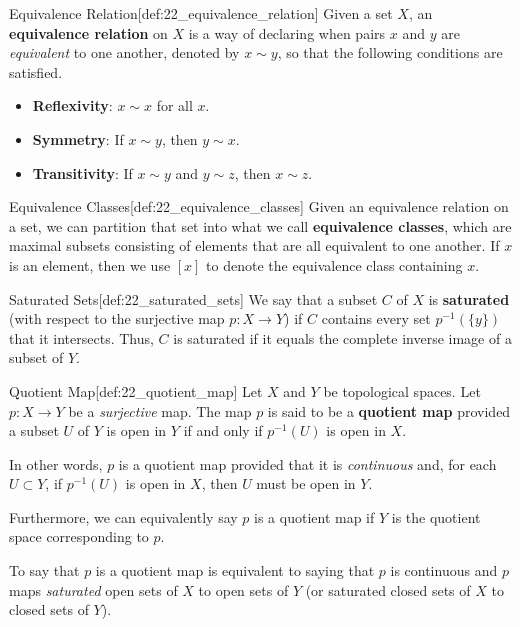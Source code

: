 \begin{defBox}{Equivalence Relation}[def:22_equivalence_relation]
    Given a set \( X \), an \textbf{equivalence relation} on \( X \) is a way of
    declaring when pairs \( x \) and \( y \) are \textit{equivalent} to one 
    another, denoted by \( x \sim y \), so that the following conditions are 
    satisfied.
    \begin{itemize}
        \item \textbf{Reflexivity}: \( x \sim x \) for all \( x \).
        \item \textbf{Symmetry}: If \( x \sim y \), then \( y \sim x \).
        \item \textbf{Transitivity}: If \( x \sim y \) and \( y \sim z \), then
            \( x \sim z \).
    \end{itemize}
\end{defBox}

\begin{defBox}{Equivalence Classes}[def:22_equivalence_classes]
    Given an equivalence relation on a set, we can partition that set into
    what we call \textbf{equivalence classes}, which are maximal subsets
    consisting of elements that are all equivalent to one another.
    If \( x \) is an element, then we use \( [ x ] \) to denote the equivalence
    class containing \( x \).
\end{defBox}

\begin{defBox}{Saturated Sets}[def:22_saturated_sets]
    We say that a 
    subset \( C \) of \( X \) is \textbf{saturated} (with respect to the
    surjective map \( p: X \rightarrow Y \)) if \( C \) contains every set 
    \( p^{ -1 } ( \{ y \} ) \) that it intersects.
    Thus, \( C \) is saturated if it equals the complete inverse image of a 
    subset of \( Y \).
\end{defBox}

\begin{defBox}{Quotient Map}[def:22_quotient_map]
    Let \( X \) and \( Y \) be topological spaces.
    Let \( p: X \rightarrow Y \) be a \textit{surjective} map.
    The map \( p \) is said to be a \textbf{quotient map} provided a subset
    \( U \) of \( Y \) is open in \( Y \) if and only if \( p^{ -1 } ( U ) \)
    is open in \( X \).

    \baseSkip

    In other words, \( p \) is a quotient map provided that it is 
    \textit{continuous} and, for each \( U \subset Y \), if \( p^{ -1 } ( U ) \)
    is open in \( X \), then \( U \) must be open in \( Y \).

    \baseSkip

    Furthermore, we can equivalently say \( p \) is a quotient map if \( Y \) 
    is the quotient space corresponding to \( p \).

    \baseRule

    To say that \( p \) is a quotient map is equivalent to saying that \( p \)
    is continuous and \( p \) maps \textit{saturated} open sets of \( X \) to
    open sets of \( Y \) (or saturated closed sets of \( X \) to closed sets
    of \( Y \)).
\end{defBox}

